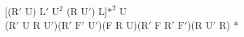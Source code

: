 [($\text{R}'$ U) $\text{L}'$ $\text{U}^2$ (R $\text{U}'$) L]$\text{*}^2$ U\\
($\text{R}'$ U R $\text{U}'$)($\text{R}'$ $\text{F}'$ $\text{U}'$)(F R U)($\text{R}'$ F $\text{R}'$ $\text{F}'$)(R $\text{U}'$ R) *\\
